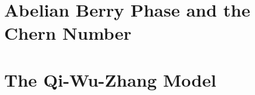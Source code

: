 

\section{Abelian Berry Phase and the Chern Number} \label{sec:Abelian Berry Phase and the Chern Number}


\section{The Qi-Wu-Zhang Model} \label{sec:qi_wu_zhang}


